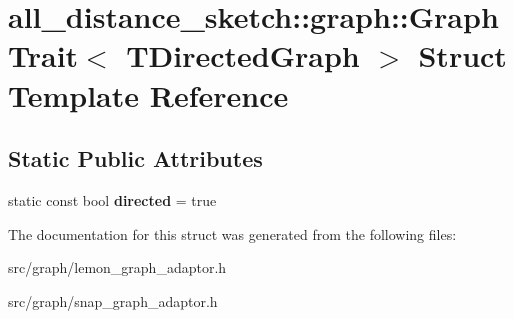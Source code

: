 \hypertarget{structall__distance__sketch_1_1graph_1_1GraphTrait_3_01TDirectedGraph_01_4}{}\section{all\+\_\+distance\+\_\+sketch\+:\+:graph\+:\+:Graph\+Trait$<$ T\+Directed\+Graph $>$ Struct Template Reference}
\label{structall__distance__sketch_1_1graph_1_1GraphTrait_3_01TDirectedGraph_01_4}
\subsection*{Static Public Attributes}
\begin{DoxyCompactItemize}
\item 
\hypertarget{structall__distance__sketch_1_1graph_1_1GraphTrait_3_01TDirectedGraph_01_4_aed07f9cc0fe0d574eef7f0ca3f59a695}{}static const bool {\bfseries directed} = true\label{structall__distance__sketch_1_1graph_1_1GraphTrait_3_01TDirectedGraph_01_4_aed07f9cc0fe0d574eef7f0ca3f59a695}

\end{DoxyCompactItemize}


The documentation for this struct was generated from the following files\+:\begin{DoxyCompactItemize}
\item 
src/graph/lemon\+\_\+graph\+\_\+adaptor.\+h\item 
src/graph/snap\+\_\+graph\+\_\+adaptor.\+h\end{DoxyCompactItemize}
